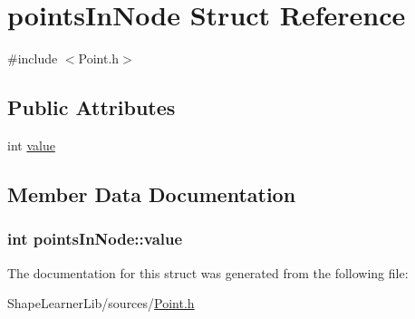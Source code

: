 \hypertarget{structpoints_in_node}{}\section{points\+In\+Node Struct Reference}
\label{structpoints_in_node}


{\ttfamily \#include $<$Point.\+h$>$}

\subsection*{Public Attributes}
\begin{DoxyCompactItemize}
\item 
int \hyperlink{structpoints_in_node_ad6367e4891b231dcc2c7de295ced3604}{value}
\end{DoxyCompactItemize}


\subsection{Member Data Documentation}
\hypertarget{structpoints_in_node_ad6367e4891b231dcc2c7de295ced3604}{}
\subsubsection[{value}]{\setlength{\rightskip}{0pt plus 5cm}int points\+In\+Node\+::value}\label{structpoints_in_node_ad6367e4891b231dcc2c7de295ced3604}


The documentation for this struct was generated from the following file\+:\begin{DoxyCompactItemize}
\item 
Shape\+Learner\+Lib/sources/\hyperlink{_point_8h}{Point.\+h}\end{DoxyCompactItemize}
